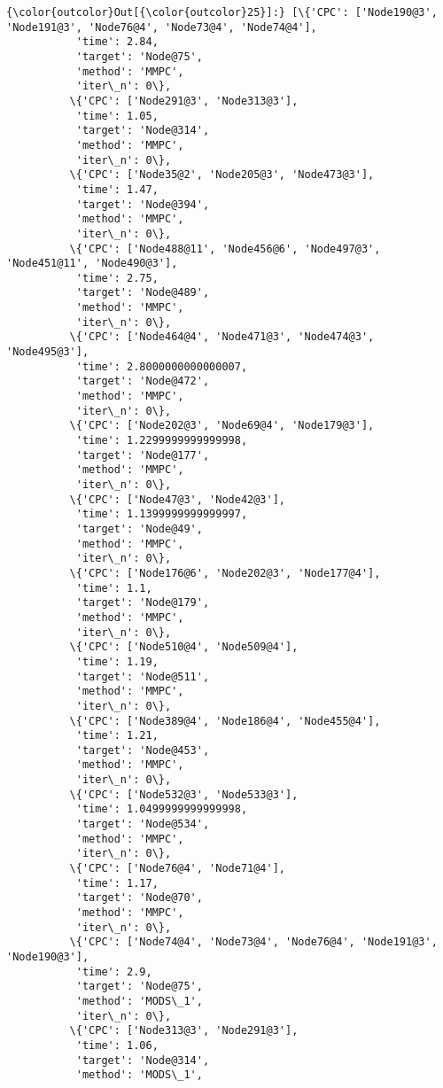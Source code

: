 \documentclass[11pt]{article}
\begin{document}
\begin{Verbatim}[commandchars=\\\{\}]
{\color{outcolor}Out[{\color{outcolor}25}]:} [\{'CPC': ['Node190@3', 'Node191@3', 'Node76@4', 'Node73@4', 'Node74@4'],
           'time': 2.84,
           'target': 'Node@75',
           'method': 'MMPC',
           'iter\_n': 0\},
          \{'CPC': ['Node291@3', 'Node313@3'],
           'time': 1.05,
           'target': 'Node@314',
           'method': 'MMPC',
           'iter\_n': 0\},
          \{'CPC': ['Node35@2', 'Node205@3', 'Node473@3'],
           'time': 1.47,
           'target': 'Node@394',
           'method': 'MMPC',
           'iter\_n': 0\},
          \{'CPC': ['Node488@11', 'Node456@6', 'Node497@3', 'Node451@11', 'Node490@3'],
           'time': 2.75,
           'target': 'Node@489',
           'method': 'MMPC',
           'iter\_n': 0\},
          \{'CPC': ['Node464@4', 'Node471@3', 'Node474@3', 'Node495@3'],
           'time': 2.8000000000000007,
           'target': 'Node@472',
           'method': 'MMPC',
           'iter\_n': 0\},
          \{'CPC': ['Node202@3', 'Node69@4', 'Node179@3'],
           'time': 1.2299999999999998,
           'target': 'Node@177',
           'method': 'MMPC',
           'iter\_n': 0\},
          \{'CPC': ['Node47@3', 'Node42@3'],
           'time': 1.1399999999999997,
           'target': 'Node@49',
           'method': 'MMPC',
           'iter\_n': 0\},
          \{'CPC': ['Node176@6', 'Node202@3', 'Node177@4'],
           'time': 1.1,
           'target': 'Node@179',
           'method': 'MMPC',
           'iter\_n': 0\},
          \{'CPC': ['Node510@4', 'Node509@4'],
           'time': 1.19,
           'target': 'Node@511',
           'method': 'MMPC',
           'iter\_n': 0\},
          \{'CPC': ['Node389@4', 'Node186@4', 'Node455@4'],
           'time': 1.21,
           'target': 'Node@453',
           'method': 'MMPC',
           'iter\_n': 0\},
          \{'CPC': ['Node532@3', 'Node533@3'],
           'time': 1.0499999999999998,
           'target': 'Node@534',
           'method': 'MMPC',
           'iter\_n': 0\},
          \{'CPC': ['Node76@4', 'Node71@4'],
           'time': 1.17,
           'target': 'Node@70',
           'method': 'MMPC',
           'iter\_n': 0\},
          \{'CPC': ['Node74@4', 'Node73@4', 'Node76@4', 'Node191@3', 'Node190@3'],
           'time': 2.9,
           'target': 'Node@75',
           'method': 'MODS\_1',
           'iter\_n': 0\},
          \{'CPC': ['Node313@3', 'Node291@3'],
           'time': 1.06,
           'target': 'Node@314',
           'method': 'MODS\_1',

\end{Verbatim}
\end{document}

